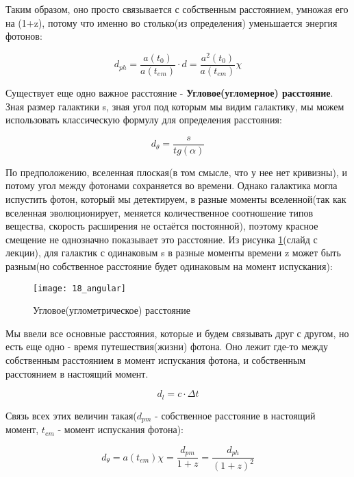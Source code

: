Таким образом, оно просто связывается с собственным расстоянием, умножая его на (1+z), потому что именно во столько(из определения) уменьшается энергия фотонов:

\begin{equation}
d_{ph} = \frac{a(t_0)}{a(t_{em})} \cdot d = \frac{a^2(t_0)}{a(t_{em})} \chi
\label{eq:18_photo_proper}
\end{equation}

Существует еще одно важное расстояние - \textbf{Угловое(угломерное) расстояние}. Зная размер галактики s, зная угол под которым мы видим галактику, мы можем использовать классическую формулу для определения расстояния:

\begin{equation}
d_{\theta} = \frac{s}{tg(\alpha)}
\label{eq:18_angular}
\end{equation}

По предположению, вселенная плоская(в том смысле, что у нее нет кривизны), и потому угол между фотонами сохраняется во времени. Однако галактика могла испустить фотон, который мы детектируем, в разные моменты вселенной(так как вселенная эволюционирует, меняется количественное соотношение типов вещества, скорость расширения не остаётся постоянной), поэтому красное смещение не однозначно показывает это расстояние. Из рисунка \ref{fig:18_angular}(слайд с лекции), для галактик с одинаковым s в разные моменты времени z может быть разным(но собственное расстояние будет одинаковым на момент испускания):

\begin{figure}[H]
	\centering
	\texttt{[image: 18\_angular]}
	\caption{Угловое(углометрическое) расстояние}
	\label{fig:18_angular}
\end{figure}

Мы ввели все основные расстояния, которые и будем связывать друг с другом, но есть еще одно - время путешествия(жизни) фотона. Оно лежит где-то между собственным расстоянием в момент испускания фотона, и собственным расстоянием в настоящий момент.

\begin{equation}
d_l = c \cdot \Delta t
\label{eq:18_lifetime}
\end{equation}

Связь всех этих величин такая($d_{pm}$ - собственное расстояние в настоящий момент, $t_{em}$ - момент испускания фотона):

\begin{equation}
d_{\theta} = a(t_{em}) \chi = \frac{d_{pm}}{1+z} = \frac{d_{ph}}{(1+z)^2}
\label{eq:18_link}
\end{equation}

